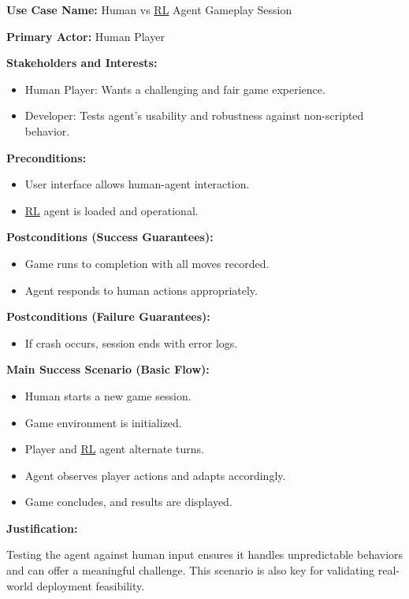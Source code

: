 \documentclass{article}
\newcommand{\RL}{\href{https://www.ibm.com/think/topics/reinforcement-learning}{RL}}
\begin{document}
\noindent\textbf{Use Case Name:} Human vs \RL{} Agent Gameplay Session

\noindent\textbf{Primary Actor:} Human Player

\noindent\textbf{Stakeholders and Interests:}
\begin{itemize}
    \item Human Player: Wants a challenging and fair game experience.
    \item Developer: Tests agent's usability and robustness against non-scripted behavior.
\end{itemize}

\noindent\textbf{Preconditions:}
\begin{itemize}
    \item User interface allows human-agent interaction.
    \item \RL{} agent is loaded and operational.
\end{itemize}

\noindent\textbf{Postconditions (Success Guarantees):}
\begin{itemize}
    \item Game runs to completion with all moves recorded.
    \item Agent responds to human actions appropriately.
\end{itemize}

\noindent\textbf{Postconditions (Failure Guarantees):}
\begin{itemize}
    \item If crash occurs, session ends with error logs.
\end{itemize}

\noindent\textbf{Main Success Scenario (Basic Flow):}
\begin{itemize}
    \item Human starts a new game session.
    \item Game environment is initialized.
    \item Player and \RL{} agent alternate turns.
    \item Agent observes player actions and adapts accordingly.
    \item Game concludes, and results are displayed.
\end{itemize}

\noindent\textbf{Justification:}

Testing the agent against human input ensures it handles unpredictable behaviors and can offer a meaningful challenge. This scenario is also key for validating real-world deployment feasibility.
\end{document}
